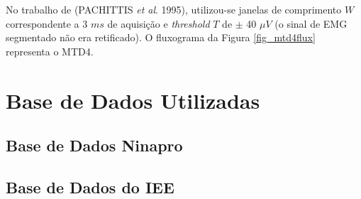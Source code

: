 No trabalho de (PACHITTIS \emph{et al}. 1995), utilizou-se janelas de comprimento $W$ correspondente a 3 $ms$ de aquisição e \emph{threshold} $T$ de $\pm$ 40 $\mu V$ (o sinal de EMG segmentado não era retificado). O fluxograma da Figura \ref{fig_mtd4flux} representa o MTD4.



\section{Base de Dados Utilizadas}
\subsection{Base de Dados Ninapro}
\subsection{Base de Dados do IEE}
